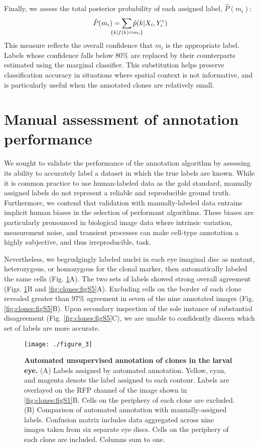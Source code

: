 Finally, we assess the total posterior probability of each assigned label, $\hat{P}(m_i)$:
\begin{equation}
\hat{P}(m_i) = \sum_{ \mathclap{ \{ k | f(k)=m_i \}} } \hat{p}(k | X_i,Y^c_i)
\end{equation}
This measure reflects the overall confidence that $m_i$ is the appropriate label. Labels whose confidence falls below 80\% are replaced by their counterparts estimated using the marginal classifier. This substitution helps preserve classification accuracy in situations where spatial context is not informative, and is particularly useful when the annotated clones are relatively small.

\section{Manual assessment of annotation performance}

We sought to validate the performance of the annotation algorithm by assessing its ability to accurately label a dataset in which the true labels are known. While it is common practice to use human-labeled data as the gold standard, manually assigned labels do not represent a reliable and reproducible ground truth. Furthermore, we contend that validation with manually-labeled data entrains implicit human biases in the selection of performant algorithms. These biases are particularly pronounced in biological image data where intrinsic variation, measurement noise, and transient processes can make cell-type annotation a highly subjective, and thus irreproducible, task. 

Nevertheless, we begrudgingly labeled nuclei in each eye imaginal disc as mutant, heterozygous, or homozygous for the clonal marker, then automatically labeled the same cells (Fig. \ref{fig:clones:fig3}A). The two sets of labels showed strong overall agreement (Figs. \ref{fig:clones:fig3}B and \ref{fig:clones:figS5}A). Excluding cells on the border of each clone revealed greater than 97\% agreement in seven of the nine annotated images (Fig. \ref{fig:clones:figS5}B). Upon secondary inspection of the sole instance of substantial disagreement (Fig. \ref{fig:clones:figS5}C), we are unable to confidently discern which set of labels are more accurate.

\begin{figure}[t]
\centering
\texttt{[image: ./figure\_3]}
\caption[Automated unsupervised annotation of clones in the larval eye.]{\textbf{Automated unsupervised annotation of clones in the larval eye.} (A) Labels assigned by automated annotation. Yellow, cyan, and magenta denote the label assigned to each contour. Labels are overlayed on the RFP channel of the image shown in \ref{fig:clones:figS1}B. Cells on the periphery of each clone are excluded. (B) Comparison of automated annotation with manually-assigned labels. Confusion matrix includes data aggregated across nine images taken from six separate eye discs. Cells on the periphery of each clone are included. Columns sum to one.}
\label{fig:clones:fig3}
\end{figure}

